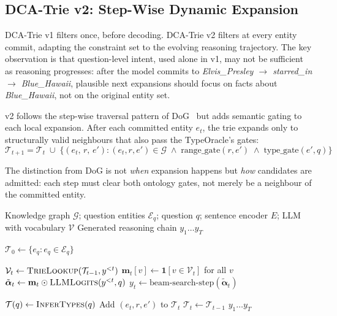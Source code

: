 \subsection{DCA-Trie v2: Step-Wise Dynamic Expansion}
\label{sec:method:v2}

DCA-Trie v1 filters once, before decoding. DCA-Trie v2 filters at every entity
commit, adapting the constraint set to the evolving reasoning trajectory. The key
observation is that question-level intent, used alone in v1, may not be sufficient as
reasoning progresses: after the model commits to \textit{Elvis\_Presley $\to$
starred\_in $\to$ Blue\_Hawaii}, plausible next expansions should focus on facts about
\textit{Blue\_Hawaii}, not on the original entity set.

v2 follows the step-wise traversal pattern of DoG~\citep{li2024-decoding-on-graphs}
but adds semantic gating to each local expansion. After each committed entity $e_t$, the
trie expands only to structurally valid neighbours that also pass the TypeOracle's
gates:
\begin{equation}
  \mathcal{T}_{t+1} = \mathcal{T}_t \;\cup\; \bigl\{(e_t,\, r,\, e') :
  (e_t, r, e') \in \mathcal{G} \;\wedge\;
  \text{range\_gate}(r, e') \;\wedge\;
  \text{type\_gate}(e', q)\bigr\}
  \label{eq:v2_expansion}
\end{equation}

The distinction from DoG is not \textit{when} expansion happens but \textit{how}
candidates are admitted: each step must clear both ontology gates, not merely be a
neighbour of the committed entity.

\begin{algorithm}[htpb]
  \caption{DCA-Trie v2: Step-Wise Semantic Expansion}
  \label{alg:v2}
  \small
  \begin{algorithmic}[1]
    \Require Knowledge graph $\mathcal{G}$; question entities $\mathcal{E}_q$;
    question $q$; sentence encoder $E$; LLM with vocabulary $\mathcal{V}$
    \Ensure Generated reasoning chain $y_1 \ldots y_T$

    \State $\mathcal{T}_0 \gets \{e_q : e_q \in \mathcal{E}_q\}$

    \State $\mathcal{V}_t \gets \textsc{TrieLookup}(\mathcal{T}_{t-1}, y^{<t})$
    \State $\mathbf{m}_t[v] \gets \mathbf{1}[v \in \mathcal{V}_t]$ for all $v$
    \State $\tilde{\boldsymbol{\alpha}}_t \gets \mathbf{m}_t \odot
      \textsc{LLMLogits}(y^{<t}, q)$
    \State $y_t \gets \text{beam-search-step}(\tilde{\boldsymbol{\alpha}}_t)$

    \State $\mathcal{T}(q) \gets \textsc{InferTypes}(q)$
    \State Add $(e_t, r, e')$ to $\mathcal{T}_t$
    \EndIf
    \EndFor
    \Else
    \State $\mathcal{T}_t \gets \mathcal{T}_{t-1}$
    \EndIf
    \EndFor
    \State \Return $y_1 \ldots y_T$
  \end{algorithmic}
\end{algorithm}

